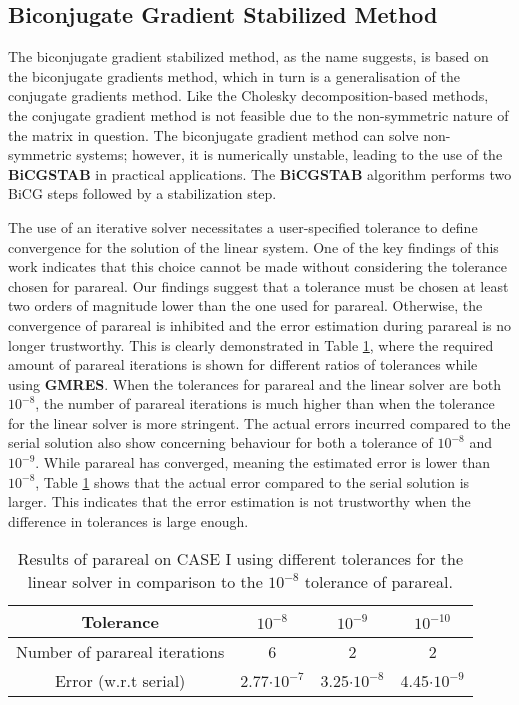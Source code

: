 \subsection{Biconjugate Gradient Stabilized Method}
The biconjugate gradient stabilized method, as the name suggests, is based on the biconjugate gradients method, which in turn is a generalisation of the conjugate gradients method. Like the Cholesky decomposition-based methods, the conjugate gradient method is not feasible due to the non-symmetric nature of the matrix in question. The biconjugate gradient method can solve non-symmetric systems; however, it is numerically unstable, leading to the use of the \textbf{BiCGSTAB} in practical applications. The \textbf{BiCGSTAB} algorithm performs two BiCG steps followed by a stabilization step. 

The use of an iterative solver necessitates a user-specified tolerance to define convergence for the solution of the linear system. One of the key findings of this work indicates that this choice cannot be made without considering the tolerance chosen for parareal. Our findings suggest that a tolerance must be chosen at least two orders of magnitude lower than the one used for parareal. Otherwise, the convergence of parareal is inhibited and the error estimation during parareal is no longer trustworthy. This is clearly demonstrated in Table \ref{tab:tolerance_lin_solver}, where the required amount of parareal iterations is shown for different ratios of tolerances while using \textbf{GMRES}. When the tolerances for parareal and the linear solver are both $10^{-8}$, the number of parareal iterations is much higher than when the tolerance for the linear solver is more stringent. The actual errors incurred compared to the serial solution also show concerning behaviour for both a tolerance of $10^{-8}$ and $10^{-9}$. While parareal has converged, meaning the estimated error is lower than $10^{-8}$, Table \ref{tab:tolerance_lin_solver} shows that the actual error compared to the serial solution is larger. This indicates that the error estimation is not trustworthy when the difference in tolerances is large enough.
\begin{table}[htbp]
    \centering
    \label{tab:tolerance_lin_solver}
    \begin{tabular}{|c|c|c|c|}
        \hline
        \textbf{Tolerance}& $10^{-8}$ & $10^{-9}$ & $10^{-10}$ \\
        \hline
         Number of parareal iterations & 6 & 2 & 2 \\
         Error (w.r.t serial) & 2.77$\cdot10^{-7}$ & 3.25$\cdot10^{-8}$ & 4.45$\cdot10^{-9}$ \\
        \hline
    \end{tabular}
    \caption{Results of parareal on CASE I using different tolerances for the linear solver in comparison to the $10^{-8}$ tolerance of parareal.  }
\end{table}

